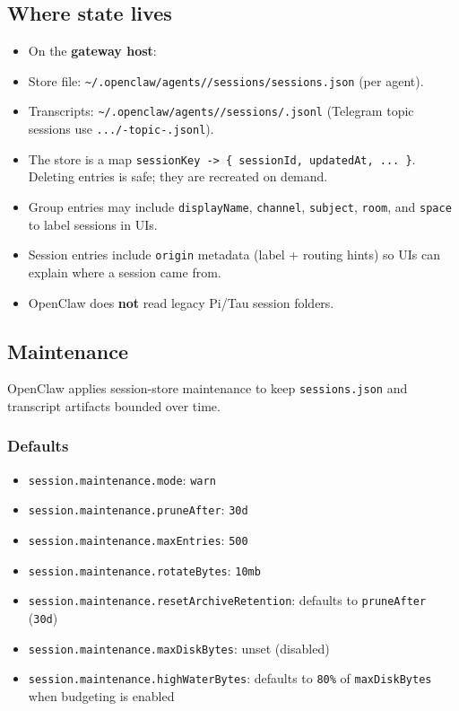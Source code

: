 \subsection{Where state lives}


\begin{itemize}
  \item On the \textbf{gateway host}:
  \item Store file: \texttt{\textasciitilde{}/.openclaw/agents//sessions/sessions.json} (per agent).
  \item Transcripts: \texttt{\textasciitilde{}/.openclaw/agents//sessions/.jsonl} (Telegram topic sessions use \texttt{.../-topic-.jsonl}).
  \item The store is a map \texttt{sessionKey -> \{ sessionId, updatedAt, ... \}}. Deleting entries is safe; they are recreated on demand.
  \item Group entries may include \texttt{displayName}, \texttt{channel}, \texttt{subject}, \texttt{room}, and \texttt{space} to label sessions in UIs.
  \item Session entries include \texttt{origin} metadata (label + routing hints) so UIs can explain where a session came from.
  \item OpenClaw does \textbf{not} read legacy Pi/Tau session folders.
\end{itemize}


\subsection{Maintenance}


OpenClaw applies session-store maintenance to keep \texttt{sessions.json} and transcript artifacts bounded over time.

\subsubsection{Defaults}


\begin{itemize}
  \item \texttt{session.maintenance.mode}: \texttt{warn}
  \item \texttt{session.maintenance.pruneAfter}: \texttt{30d}
  \item \texttt{session.maintenance.maxEntries}: \texttt{500}
  \item \texttt{session.maintenance.rotateBytes}: \texttt{10mb}
  \item \texttt{session.maintenance.resetArchiveRetention}: defaults to \texttt{pruneAfter} (\texttt{30d})
  \item \texttt{session.maintenance.maxDiskBytes}: unset (disabled)
  \item \texttt{session.maintenance.highWaterBytes}: defaults to \texttt{80\%} of \texttt{maxDiskBytes} when budgeting is enabled
\end{itemize}


